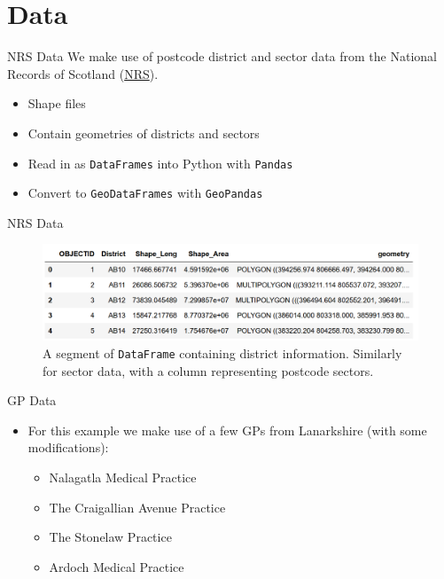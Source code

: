 \documentclass[hyperref={breaklinks,colorlinks,
   urlcolor=blue,citecolor=blue,linkcolor=red}]{beamer}
\newcommand{\Python}{{\sc Python}\xspace}
\begin{document}
\section{Data}
\begin{frame}{NRS Data}
We make use of postcode district
and sector data from the National Records of Scotland (\href{https://www.nrscotland.gov.uk/statistics-and-data/geography/nrs-postcode-extract}{NRS}).
\begin{itemize}
\item{Shape files}
\item{Contain geometries of districts and sectors}
\item{Read in as \texttt{DataFrames} into \Python with
\texttt{Pandas}}
\item{Convert to \texttt{GeoDataFrames} with \texttt{GeoPandas}}
\end{itemize}
\end{frame}

\begin{frame}{NRS Data}
\begin{figure}
\begin{center}
\includegraphics[scale=0.5]{districtcolumns}
\caption{A segment of \texttt{DataFrame} containing district information. Similarly for sector data, with a column
representing postcode sectors.}
\end{center}
\end{figure}
\end{frame}

\begin{frame}{GP Data}
\begin{itemize}
\item{For this example we make use of a few GPs from Lanarkshire (with some modifications):}
\begin{itemize}
\item{Nalagatla Medical Practice}
\item{The Craigallian Avenue Practice}
\item{The Stonelaw Practice}
\item{Ardoch Medical Practice}
\end{itemize}
\end{itemize}
\end{frame}
\end{document}
